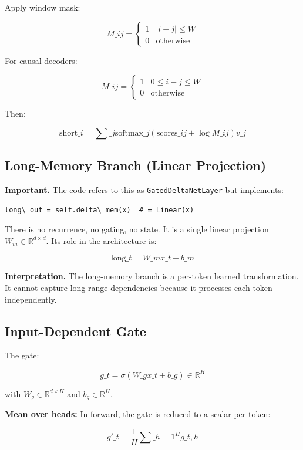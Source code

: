 Apply window mask:

\[
M\_{ij} = \begin{cases} 1 & |i - j| \leq W \\ 0 & \text{otherwise} \end{cases}
\tag{4.2}
\]

For causal decoders:

\[
M\_{ij} = \begin{cases} 1 & 0 \leq i - j \leq W \\ 0 & \text{otherwise} \end{cases}
\tag{4.3}
\]

Then:

\[
\text{short}\_i = \sum\_j \text{softmax}\_j(\text{scores}\_{ij} + \log M\_{ij}) v\_j
\tag{4.4}
\]

\subsection{Long-Memory Branch (Linear Projection)}

\textbf{Important.} The code refers to this as \texttt{GatedDeltaNetLayer} but 
implements:

\begin{lstlisting}
long\_out = self.delta\_mem(x)  # = Linear(x)
\end{lstlisting}

There is no recurrence, no gating, no state. It is a single linear 
projection $W_m \in \mathbb{R}^{d \times d}$. Its role in the architecture 
is:

\[
\text{long}\_t = W\_m x\_t + b\_m
\tag{4.5}
\]

\textbf{Interpretation.} The long-memory branch is a per-token learned 
transformation. It cannot capture long-range dependencies because it 
processes each token independently.

\subsection{Input-Dependent Gate}

The gate:

\[
g\_t = \sigma(W\_g x\_t + b\_g) \in \mathbb{R}^H
\tag{4.6}
\]

with $W_g \in \mathbb{R}^{d \times H}$ and $b_g \in \mathbb{R}^H$.

\textbf{Mean over heads:} In forward, the gate is reduced to a scalar per token:

\[
g'\_t = \frac{1}{H} \sum\_{h=1}^H g\_{t,h}
\tag{4.7}
\]

